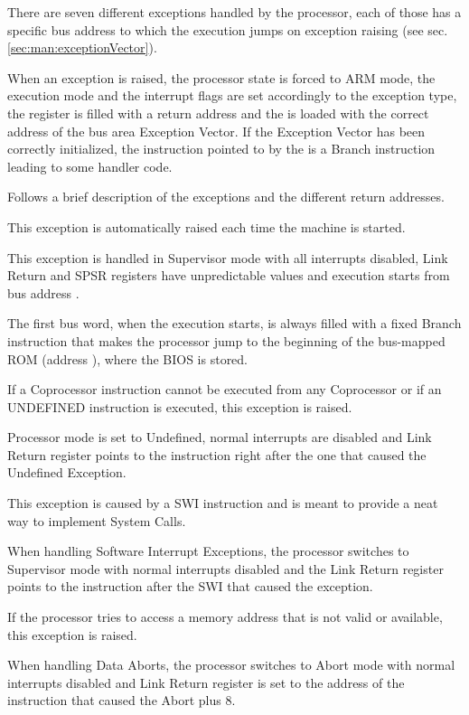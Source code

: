 There are seven different exceptions handled by the processor, each of those has a specific bus address to which the execution jumps on exception raising (see sec. \ref{sec:man:exceptionVector}).

When an exception is raised, the processor state is forced to ARM mode, the execution mode and the interrupt flags are set accordingly to the exception type, the  register is filled with a return address and the  is loaded with the correct address of the bus area Exception Vector. 
If the Exception Vector has been correctly initialized, the instruction pointed to by the  is a Branch instruction leading to some handler code.

Follows a brief description of the exceptions and the different return addresses.

This exception is automatically raised each time the machine is started. 

This exception is handled in Supervisor mode with all interrupts disabled, Link Return and SPSR registers have unpredictable values and execution starts from bus address .

The first bus word, when the execution starts, is always filled with a fixed Branch instruction that makes the processor jump to the beginning of the bus-mapped ROM (address ), where the BIOS is stored.

If a Coprocessor instruction cannot be executed from any Coprocessor or if an UNDEFINED instruction is executed, this exception is raised. 

Processor mode is set to Undefined, normal interrupts are disabled and Link Return register points to the instruction right after the one that caused the Undefined Exception.

This exception is caused by a SWI instruction and is meant to provide a neat way to implement System Calls. 

When handling Software Interrupt Exceptions, the processor switches to Supervisor mode with normal interrupts disabled and the Link Return register points to the instruction after the SWI that caused the exception.

If the processor tries to access a memory address that is not valid or available, this exception is raised.

When handling Data Aborts, the processor switches to Abort mode with normal interrupts disabled and Link Return register is set to the address of the instruction that caused the Abort plus 8.


